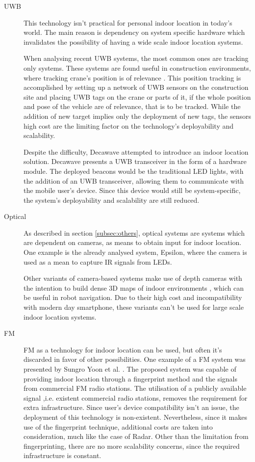 \begin{description}
 
 
 
\item[\acf{UWB}] This technology isn't practical for personal indoor location in today's world. The main reason is dependency on system specific hardware which invalidates the possibility of having a wide scale indoor location systems. 
 
 
When analysing recent \ac{UWB} systems, the most common ones are tracking only systems. These systems are found useful in construction environments, where tracking crane's position is of relevance \cite{uwb-ex1}. This position tracking is accomplished by setting up a network of \ac{UWB} sensors on the construction site and placing \ac{UWB} tags on the crane or parts of it, if the whole position and pose of the vehicle are of relevance, that is to be tracked. While the addition of new target implies only the deployment of new tags, the sensors high cost are the limiting factor on the technology's deployability and scalability.  
 
 
Despite the difficulty, Decawave \cite{uwb-ex2} attempted to introduce an indoor location solution. Decawave presents a \ac{UWB} transceiver in the form of a hardware module. The deployed beacons would be the traditional LED lights, with the addition of an \ac{UWB} transceiver, allowing them to communicate with the mobile user's device. Since this device would still be system-specific, the system's deployability and scalability are still reduced. 
 
 
\item [Optical] As described in section \ref{subsec:others}, optical systems are systems which are dependent on cameras, as means to obtain input for indoor location. One example is the already analysed system, Epsilon, where the camera is used as a mean to capture \ac{IR} signals from LEDs.  
 
 
Other variants of camera-based systems make use of depth cameras with the intention to build dense 3D maps of indoor environments \cite{camera_ex}, which can be useful in robot navigation. Due to their high cost and incompatibility with modern day smartphone, these variants can't be used for large scale indoor location systems. 
 
 
\item[FM]  FM as a technology for indoor location can be used, but often it's discarded in favor of other possibilities. One example of a FM system was presented by Sungro Yoon et al. \cite{fm_ex}. The proposed system was capable of providing indoor location through a fingerprint method and the signals from commercial \ac{FM} radio stations. The utilisation of a publicly available signal ,i.e. existent commercial radio stations, removes the requirement for extra infrastructure. Since user's device compatibility isn't an issue, the deployment of this technology is non-existent. Nevertheless, since it makes use of the fingerprint technique, additional costs are taken into consideration, much like the case of Radar. Other than the limitation from fingerprinting, there are no more scalability concerns, since the required infrastructure is constant. 
 

\end{description}
